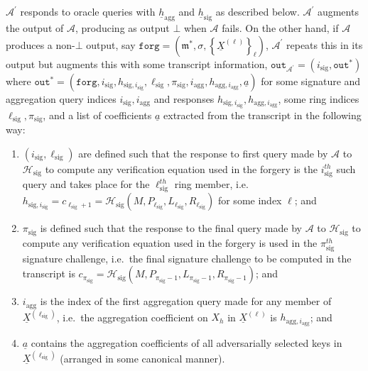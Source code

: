 \documentclass{mrl}
\theoremstyle{definition}
\numberwithin{theorem}{subsection}
\newcommand{\adversary}{\mathcal{A}}
\newcommand{\m}{\mathfrak{m}}
\begin{document}
$\adversary^\prime$ responds to oracle queries with $\underline{h}_{\text{agg}}$ and $\underline{h}_{\text{sig}}$ as described below. $\adversary^\prime$ augments the output of $\adversary$, producing as output $\bot$ when $\adversary$ fails. On the other hand, if $\adversary$ produces a non-$\bot$ output, say $\texttt{forg} = \left(\m^*, \sigma, \left\{\underline{X}^{(\ell)}\right\}_\ell\right)$, $\adversary^\prime$ repeats this in its output but augments this with some transcript information, $\texttt{out}_{\adversary^\prime} = (i_{\text{sig}}, \texttt{out}^*)$ where $\texttt{out}^* = (\texttt{forg}, i_{\text{sig}}, h_{\text{sig}, i_{\text{sig}}}, \ell_{\text{sig}}, \pi_{\text{sig}}, i_{\text{agg}}, h_{\text{agg}, i_{\text{agg}}}, \underline{a})$ for some signature and aggregation query indices $i_{\text{sig}}, i_{\text{agg}}$ and responses $h_{\text{sig}, i_{\text{sig}}}, h_{\text{agg}, i_{\text{agg}}}$, some ring indices $\ell_{\text{sig}}, \pi_{\text{sig}}$, and a list of coefficients $\underline{a}$ extracted from the transcript in the following way:
\begin{enumerate}
\item $(i_{\text{sig}}, \ell_{\text{sig}})$ are defined such that the response to first query made by $\adversary$ to $\mathcal{H}_{\text{sig}}$ to compute any verification equation used in the forgery is the $i_{\text{sig}}^{th}$ such query and takes place for the $\ell_{\text{sig}}^{th}$ ring member, i.e.\ $h_{\text{sig}, i_{\text{sig}}} = c_{\ell_{\text{sig}}+1} = \mathcal{H}_{\text{sig}}(M, P_{\ell_{\text{sig}}}, L_{\ell_{\text{sig}}}, R_{\ell_{\text{sig}}})$ for some index $\ell$; and

\item $\pi_{\text{sig}}$ is defined such that the response to the final query made by $\adversary$ to $\mathcal{H}_{\text{sig}}$ to compute any verification equation used in the forgery is used in the $\pi_{\text{sig}}^{th}$ signature challenge, i.e.\ the final signature challenge to be computed in the transcript is $c_{\pi_{\text{sig}}} = \mathcal{H}_{\text{sig}}(M, P_{\pi_{\text{sig}}-1},  L_{\pi_{\text{sig}}-1}, R_{\pi_{\text{sig}}-1})$; and

\item $i_{\text{agg}}$ is the index of the first aggregation query made for any member of $\underline{X}^{(\ell_{\text{sig}})}$, i.e.\ the aggregation coefficient on $X_h$ in $\underline{X}^{(\ell)}$ is $h_{\text{agg},i_{\text{agg}}}$; and

\item $\underline{a}$ contains the aggregation coefficients of all adversarially selected keys in $\underline{X}^{(\ell_{\text{sig}})}$ (arranged in some canonical manner).


\end{enumerate}
\end{document}
